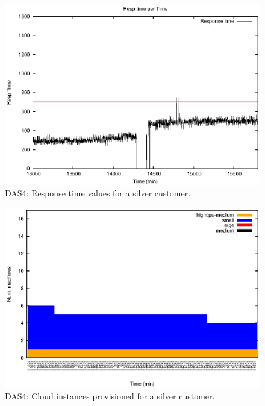 \begin{figure}
  \begin{center}
    \includegraphics[width=.85\linewidth]{images/exps2011/medium/das/proxyDataPoints_output_filtered.eps}
  \end{center}
\vspace{-5mm}
  \caption{DAS4: Response time values for a silver customer.}
  \label{mediumResponseTime}
\end{figure}


\begin{figure}
  \begin{center}
    \includegraphics[width=.85\linewidth]{images/exps2011/medium/das/inst_type_machines_filtered.eps}
  \end{center}
\vspace{-5mm}
  \caption{DAS4: Cloud instances provisioned for a silver customer.}
  \label{mediumInstances}
\end{figure}



